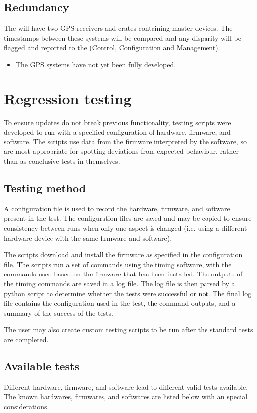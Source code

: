 \documentclass{dune}
\begin{document}
\subsection{Redundancy}
The  will have two GPS receivers and crates containing master devices.
The timestamps between these systems will be compared and any disparity will be flagged and reported to the  (Control, Configuration and Management).
\begin{itemize}
  \item The GPS systems have not yet been fully developed.
\end{itemize}


\section{Regression testing}
\label{sec:test-scripts}
To ensure updates do not break previous functionality, testing scripts were developed to run with a specified configuration of hardware, firmware, and software.
The scripts use data from the firmware interpreted by the software, so are most appropriate for spotting deviations from expected behaviour, rather than as conclusive tests in themselves.

\subsection{Testing method}
A configuration file is used to record the hardware, firmware, and software present in the test.
The configuration files are saved and may be copied to ensure consistency between runs when only one aspect is changed (i.e. using a different hardware device with the same firmware and software).

The scripts download and install the firmware as specified in the configuration file.
The scripts run a set of commands using the timing software, with the commands used based on the firmware that has been installed.
The outputs of the timing commands are saved in a log file.
The log file is then parsed by a python script to determine whether the tests were successful or not.
The final log file contains the configuration used in the test, the command outputs, and a summary of the success of the tests.

The user may also create custom testing scripts to be run after the standard tests are completed.

\subsection{Available tests}
Different hardware, firmware, and software lead to different valid tests available.
The known hardwares, firmwares, and softwares are listed below with an special considerations.
\end{document}
